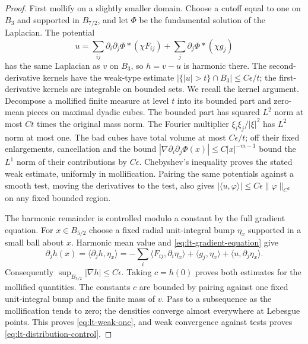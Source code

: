 \begin{proof}
First mollify on a slightly smaller domain.  Choose a cutoff equal to one on
$B_3$ and supported in $B_{7/2}$, and let $\Phi$ be the fundamental solution
of the Laplacian.  The potential
\[
 u=\sum_{ij}\partial_i\partial_j\Phi*(\chi F_{ij})
                       +\sum_j\partial_j\Phi*(\chi g_j)
\]
has the same Laplacian as $v$ on $B_3$, so $h=v-u$ is harmonic there.
The second-derivative kernels have the weak-type estimate
$|\{|u|>t\}\cap B_3|\le C\epsilon/t$; the first-derivative kernels are
integrable on bounded sets.  We recall the kernel argument.  Decompose a
mollified finite measure at level $t$ into its bounded part and zero-mean
pieces on maximal dyadic cubes.  The bounded part has squared $L^2$ norm at
most $Ct$ times the original mass norm.  The Fourier multiplier
$\xi_i\xi_j/|\xi|^2$ has $L^2$ norm at most one.  The bad cubes have total
volume at most $C\epsilon/t$; off their fixed enlargements, cancellation and
the bound $|\nabla\partial_i\partial_j\Phi(x)|\le C|x|^{-m-1}$ bound the
$L^1$ norm of their contributions by $C\epsilon$.  Chebyshev's inequality
proves the stated weak estimate, uniformly in mollification.  Pairing the
same potentials against a smooth test, moving the derivatives to the test,
also gives $|\langle u,\varphi\rangle|\le
C\epsilon\|\varphi\|_{C^k}$ on any fixed bounded region.

The harmonic remainder is controlled modulo a constant by the full gradient
equation.  For $x\in B_{5/2}$ choose a fixed radial unit-integral bump
$\eta_x$ supported in a small ball about $x$.  Harmonic mean value and
\eqref{eq:lt-gradient-equation} give
\[
 \partial_jh(x)=\langle\partial_jh,\eta_x\rangle
   =-\sum_i\langle F_{ij},\partial_i\eta_x\rangle
      +\langle g_j,\eta_x\rangle
      +\langle u,\partial_j\eta_x\rangle.
\]
Consequently $\sup_{B_{5/2}}|\nabla h|\le C\epsilon$.  Taking $c=h(0)$
proves both estimates for the mollified quantities.  The constants $c$ are
bounded by pairing against one fixed unit-integral bump and the finite mass
of $v$.  Pass to a subsequence as the mollification tends to zero; the
densities converge almost everywhere at Lebesgue points.  This proves
\eqref{eq:lt-weak-one}, and weak convergence against tests proves
\eqref{eq:lt-distribution-control}.
\end{proof}


